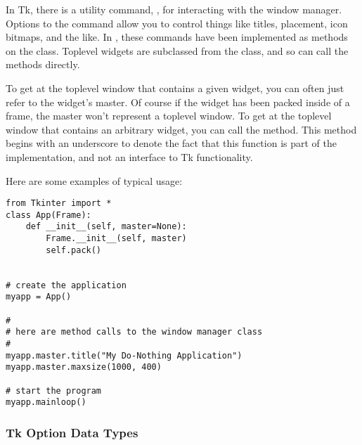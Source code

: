 In Tk, there is a utility command, , for interacting with the
window manager.  Options to the  command allow you to control
things like titles, placement, icon bitmaps, and the like.  In
, these commands have been implemented as methods
on the  class.  Toplevel widgets are subclassed from the
 class, and so can call the  methods directly.


To get at the toplevel window that contains a given widget, you can
often just refer to the widget's master.  Of course if the widget has
been packed inside of a frame, the master won't represent a toplevel
window.  To get at the toplevel window that contains an arbitrary
widget, you can call the  method.  This
method begins with an underscore to denote the fact that this function
is part of the implementation, and not an interface to Tk functionality.

Here are some examples of typical usage:

\begin{verbatim}
from Tkinter import *
class App(Frame):
    def __init__(self, master=None):
        Frame.__init__(self, master)
        self.pack()


# create the application
myapp = App()

#
# here are method calls to the window manager class
#
myapp.master.title("My Do-Nothing Application")
myapp.master.maxsize(1000, 400)

# start the program
myapp.mainloop()
\end{verbatim}


\subsubsection{Tk Option Data Types} %


